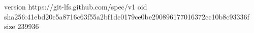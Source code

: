 version https://git-lfs.github.com/spec/v1
oid sha256:41ebd20c5a8716c63f55a2bf1dc0179ce0be290896177016372cc10b8c93336f
size 239936
